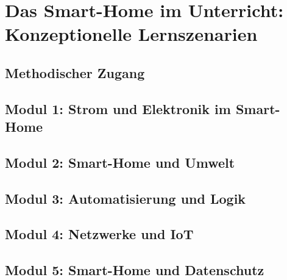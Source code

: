 \chapter{Das Smart-Home im Unterricht: Konzeptionelle Lernszenarien}\label{chap:unterrichtsszenarien}

\section{Methodischer Zugang}\label{sec:methodischer-zugang}

\section{Modul 1: Strom und Elektronik im Smart-Home}\label{sec:modul-strom-elektronik}

\section{Modul 2: Smart-Home und Umwelt}\label{sec:modul-umwelt}

\section{Modul 3: Automatisierung und Logik}\label{sec:modul-automatisierung-logik}

\section{Modul 4: Netzwerke und IoT}\label{sec:modul-netzwerke-iot}

\section{Modul 5: Smart-Home und Datenschutz}\label{sec:modul-datenschutz}
